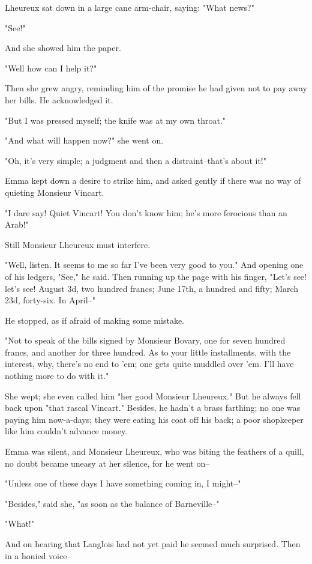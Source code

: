 \documentclass[11pt,twocolumn]{ltugboat}
\begin{document}
Lheureux sat down in a large cane arm-chair, saying: "What news?"

"See!"

And she showed him the paper.

"Well how can I help it?"

Then she grew angry, reminding him of the promise he had given not to
pay away her bills. He acknowledged it.

"But I was pressed myself; the knife was at my own throat."

"And what will happen now?" she went on.

"Oh, it's very simple; a judgment and then a distraint--that's about
it!"

Emma kept down a desire to strike him, and asked gently if there was no
way of quieting Monsieur Vincart.

"I dare say! Quiet Vincart! You don't know him; he's more ferocious than
an Arab!"

Still Monsieur Lheureux must interfere.

"Well, listen. It seems to me so far I've been very good to you." And
opening one of his ledgers, "See," he said. Then running up the page
with his finger, "Let's see! let's see! August 3d, two hundred francs;
June 17th, a hundred and fifty; March 23d, forty-six. In April--"

He stopped, as if afraid of making some mistake.

"Not to speak of the bills signed by Monsieur Bovary, one for seven
hundred francs, and another for three hundred. As to your little
installments, with the interest, why, there's no end to 'em; one gets
quite muddled over 'em. I'll have nothing more to do with it."

She wept; she even called him "her good Monsieur Lheureux." But he
always fell back upon "that rascal Vincart." Besides, he hadn't a brass
farthing; no one was paying him now-a-days; they were eating his coat
off his back; a poor shopkeeper like him couldn't advance money.

Emma was silent, and Monsieur Lheureux, who was biting the feathers of a
quill, no doubt became uneasy at her silence, for he went on--

"Unless one of these days I have something coming in, I might--"

"Besides," said she, "as soon as the balance of Barneville--"

"What!"

And on hearing that Langlois had not yet paid he seemed much surprised.
Then in a honied voice--
\end{document}

